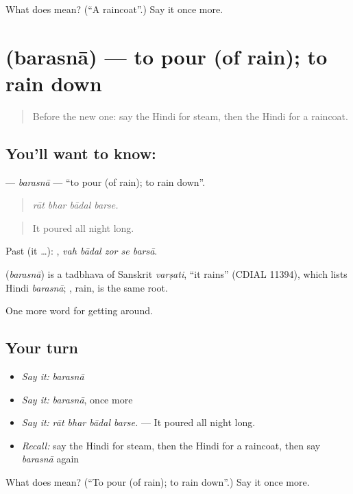 \begin{tcolorbox}[breakable,colback=teal!4,colframe=teal!35!black,title={Before you move on}]
What does  mean? (\textquotedblleft{}A raincoat\textquotedblright{}.) Say it once more.
\end{tcolorbox}
\section[\texorpdfstring{\hi{बरसना} (barasnā)}{बरसना (barasnā)}]{ (barasnā) — to pour (of rain); to rain down}

\label{lesson:HI-C436-barasna}



\begin{quote}
Before the new one: say the Hindi for steam, then the Hindi for a raincoat.
\end{quote}

\subsection*{You'll want to know: }
\textbf{} — \emph{barasnā} — \textquotedblleft{}to pour (of rain); to rain down\textquotedblright{}.

\begin{quote}
   
\end{quote}

\begin{quote}
\emph{rāt bhar bādal barse.}
\end{quote}

\begin{quote}
It poured all night long.
\end{quote}

Past (it …):     , \emph{vah bādal zor se barsā}.

\begin{cousinweb}
\textbf{} (\emph{barasnā}) is a tadbhava of Sanskrit \emph{varṣati}, \textquotedblleft{}it rains\textquotedblright{} (CDIAL 11394), which lists Hindi \emph{barasnā}; , rain, is the same root.
\end{cousinweb}

\begin{grammarlens}[title={What you've built}]
One more word for getting around.
\end{grammarlens}

\subsection*{Your turn}
\begin{itemize}
\raggedright
  \item \emph{Say it:} \emph{barasnā}
  \item \emph{Say it:} \emph{barasnā}, once more
  \item \emph{Say it:} \emph{rāt bhar bādal barse.} — It poured all night long.
  \item \emph{Recall:} say the Hindi for steam, then the Hindi for a raincoat, then say \emph{barasnā} again
\end{itemize}

\begin{tcolorbox}[breakable,colback=teal!4,colframe=teal!35!black,title={Before you move on}]
What does  mean? (\textquotedblleft{}To pour (of rain); to rain down\textquotedblright{}.) Say it once more.
\end{tcolorbox}
